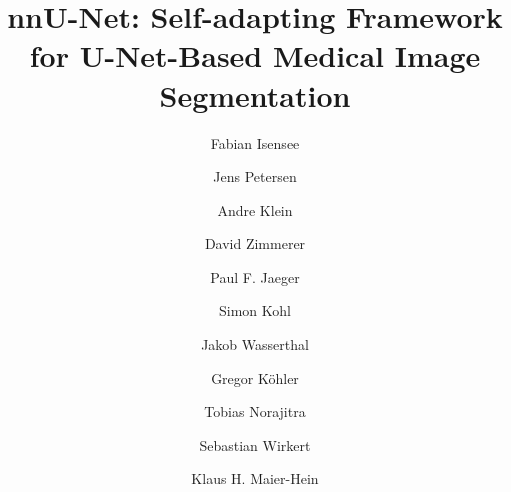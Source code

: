 \documentclass{templates/llncs} %
\begin{document}


\title{nnU-Net: Self-adapting Framework \\for U-Net-Based Medical Image Segmentation}



\author{
Fabian Isensee \and
Jens Petersen \and
Andre Klein \and
David Zimmerer \and
Paul F. Jaeger \and
Simon Kohl \and
Jakob Wasserthal \and
Gregor K\"ohler \and
Tobias Norajitra \and
Sebastian Wirkert \and
Klaus H. Maier-Hein}
%
\tocauthor{**************, **************, **************}
%

\maketitle   %
\end{document}
